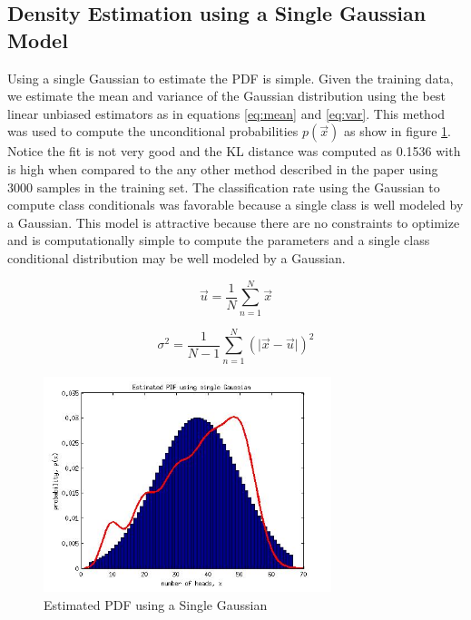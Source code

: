 \documentclass[journal]{IEEEtran}
\begin{document}
\subsection{Density Estimation using a Single Gaussian Model}
\par Using a single Gaussian to estimate the PDF is simple. Given the training data, we estimate the mean and variance of the Gaussian distribution using the best linear unbiased estimators as in equations \ref{eq:mean} and \ref{eq:var}. This method was used to compute the unconditional probabilities \(p(\vec{x})\) as show in figure \ref{fig:PDF_Gaussian}. Notice the fit is not very good and the KL distance was computed as 0.1536 with is high when compared to the any other method described in the paper using 3000 samples in the training set. The classification rate using the Gaussian to compute class conditionals was favorable because a single class is well modeled by a Gaussian. This model is attractive because there are no constraints to optimize and is computationally simple to compute the parameters and a single class conditional distribution may be well modeled by a Gaussian.

\begin{equation}
\label{eq:mean}
\vec{u} = \frac{1}{N}\sum_{n=1}^{N}{\vec{x}}
\end{equation}

\begin{equation}
\label{eq:var}
\sigma^2 = \frac{1}{N-1}\sum_{n=1}^{N}{(\lvert\vec{x} - \vec{u}\rvert)^2}
\end{equation}

\begin{figure}[h]
\centering
\includegraphics[width=3.3in]{../images/PDF_SingleGaussian.jpg}
\caption{Estimated PDF using a Single Gaussian}
\label{fig:PDF_Gaussian}
\end{figure}
\end{document}
